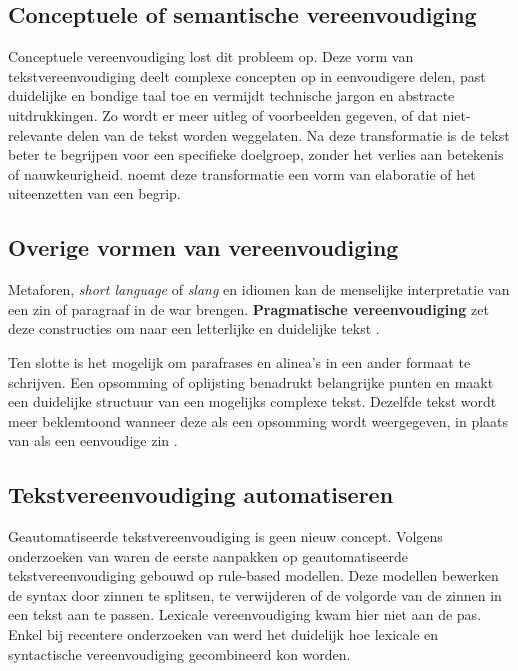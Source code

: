 
\subsection{Conceptuele of semantische vereenvoudiging}

Conceptuele vereenvoudiging lost dit probleem op. Deze vorm van tekstvereenvoudiging deelt complexe concepten op in eenvoudigere delen, past duidelijke en bondige taal toe en vermijdt technische jargon en abstracte uitdrukkingen. Zo wordt er meer uitleg of voorbeelden gegeven, of dat niet-relevante delen van de tekst worden weggelaten. Na deze transformatie is de tekst beter te begrijpen voor een specifieke doelgroep, zonder het verlies aan betekenis of nauwkeurigheid. \textcite{Siddharthan2014} noemt deze transformatie een vorm van elaboratie of het uiteenzetten van een begrip.

\subsection{Overige vormen van vereenvoudiging}

Metaforen, \textit{short language} of \textit{slang} en idiomen kan de menselijke interpretatie van een zin of paragraaf in de war brengen. \textbf{Pragmatische vereenvoudiging} zet deze constructies om naar een letterlijke en duidelijke tekst \autocite{JavoureyDrevet2022}.

Ten slotte is het mogelijk om parafrases en alinea's in een ander formaat te schrijven. Een opsomming of oplijsting benadrukt belangrijke punten en maakt een duidelijke structuur van een mogelijks complexe tekst. Dezelfde tekst wordt meer beklemtoond wanneer deze als een opsomming wordt weergegeven, in plaats van als een eenvoudige zin \autocite{Siddharthan2014, Hale2022}. 

\subsection{Tekstvereenvoudiging automatiseren}

Geautomatiseerde tekstvereenvoudiging is geen nieuw concept. Volgens onderzoeken van \textcite{Canning2000, Siddharthan2006} waren de eerste aanpakken op geautomatiseerde tekstvereenvoudiging gebouwd op rule-based modellen. Deze modellen bewerken de syntax door zinnen te splitsen, te verwijderen of de volgorde van de zinnen in een tekst aan te passen. Lexicale vereenvoudiging kwam hier niet aan de pas. Enkel bij recentere onderzoeken van \textcite{Coster2011, Bulte2018} werd het duidelijk hoe lexicale en syntactische vereenvoudiging gecombineerd kon worden.

